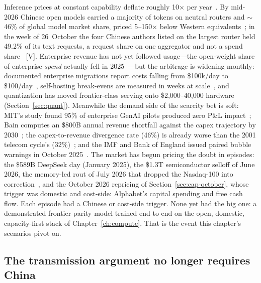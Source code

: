 Inference prices at constant capability deflate roughly 10$\times$ per year~\cite{llmflation}. By mid-2026 Chinese open models carried a majority of tokens on neutral routers and $\sim$46\% of global model market share, priced 5--150$\times$ below Western equivalents~\cite{openrouter-2026,chinese-share-forbes}; in the week of 26~October the four Chinese authors listed on the largest router held 49.2\% of its text requests, a request share on one aggregator and not a spend share~\cite{mdl-openrouter-oct26} [V]. Enterprise revenue has not yet followed usage---the open-weight share of enterprise \emph{spend} actually fell in 2025~\cite{menlo}---but the arbitrage is widening monthly: documented enterprise migrations report costs falling from \$100k/day to \$100/day~\cite{chinese-share-forbes}, self-hosting break-evens are measured in weeks at scale~\cite{selfhost}, and quantization has moved frontier-class serving onto \$2,000--40,000 hardware (Section~\ref{sec:quant}). Meanwhile the demand side of the scarcity bet is soft: MIT's study found 95\% of enterprise GenAI pilots produced zero P\&L impact~\cite{mit-nanda}; Bain computes an \$800B annual revenue shortfall against the capex trajectory by 2030~\cite{bain-2t}; the capex-to-revenue divergence rate (46\%) is already worse than the 2001 telecom cycle's (32\%)~\cite{capex-divergence}; and the IMF and Bank of England issued paired bubble warnings in October 2025~\cite{imf-boe}. The market has begun pricing the doubt in episodes: the \$589B DeepSeek day (January 2025), the \$1.3T semiconductor selloff of June 2026, the memory-led rout of July 2026 that dropped the Nasdaq-100 into correction~\cite{r1-shock,semis-selloff,memory-rout}, and the October 2026 repricing of Section~\ref{sec:cap-october}, whose trigger was domestic and cost-side: Alphabet's capital spending and free cash flow. Each episode had a Chinese or cost-side trigger. None yet had the big one: a demonstrated frontier-parity model trained end-to-end on the open, domestic, capacity-first stack of Chapter~\ref{ch:compute}. That is the event this chapter's scenarios pivot on.

\subsection{The transmission argument no longer requires China}
\label{sec:overdetermined}

